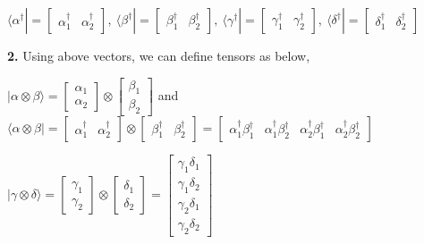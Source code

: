 \documentclass [12pt]{article}
\theoremstyle{definition}
\newcommand{\ket}[1]{| {#1} \rangle}
\newcommand{\bra}[1]{\langle {#1} |}
\newcommand{\tensor}[2]{ #1 \otimes  #2 }
\begin{document}
\phantom{1000em} $\bra{\alpha^{\dag}} = \begin{bmatrix} \alpha^{\dag}_{1} & \alpha^{\dag}_{2}\end{bmatrix}, \ \bra{\beta^{\dag}} = \begin{bmatrix} \beta^{\dag}_{1} & \beta^{\dag}_{2}\end{bmatrix}, \ \bra{\gamma^{\dag}} = \begin{bmatrix} \gamma^{\dag}_{1} & \gamma^{\dag}_{2}\end{bmatrix}, \ \bra{\delta^{\dag}} = \begin{bmatrix} \delta^{\dag}_{1} & \delta^{\dag}_{2}\end{bmatrix}$

\phantom{1em} {\bf 2.} Using above vectors, we can define tensors as below,

\phantom{1000em} $\ket{\tensor{\alpha}{\beta}} = \tensor{\begin{bmatrix} \alpha_{1} \\ \alpha_{2}\end{bmatrix}}{\begin{bmatrix} \beta_{1} \\ \beta_{2}\end{bmatrix}}$ and $\bra{\tensor{\alpha}{\beta}} = \tensor{\begin{bmatrix} \alpha^{\dag}_{1} & \alpha^{\dag}_{2}\end{bmatrix}}{\begin{bmatrix} \beta^{\dag}_{1} & \beta^{\dag}_{2}\end{bmatrix}} = \begin{bmatrix}\alpha^{\dag}_{1}\beta^{\dag}_{1} & \alpha^{\dag}_{1}\beta^{\dag}_{2} & \alpha^{\dag}_{2}\beta^{\dag}_{1} & \alpha^{\dag}_{2}\beta^{\dag}_{2}\end{bmatrix}$

\phantom{1000em} $\ket{\tensor{\gamma}{\delta}} = \tensor{\begin{bmatrix} \gamma_{1} \\ \gamma_{2}\end{bmatrix}}{\begin{bmatrix} \delta_{1} \\ \delta_{2}\end{bmatrix}} = \begin{bmatrix}\gamma_{1}\delta_{1} \\ \gamma_{1}\delta_{2} \\ \gamma_{2}\delta_{1} \\ \gamma_{2}\delta_{2}\end{bmatrix}$
\end{document}
